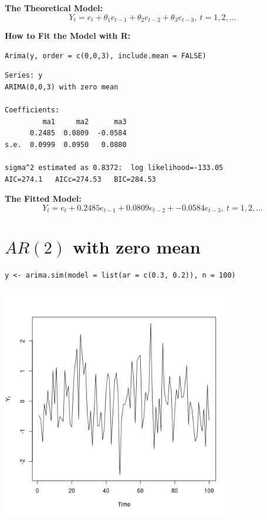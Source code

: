 \documentclass[12pt]{article}
\begin{document}
\noindent
\textbf{The Theoretical Model:} 
\[
Y_{t} = e_{t} + \theta_{1}e_{t - 1} + \theta_{2}e_{t - 2} + \theta_{3}e_{t - 3},\ t = 1,2,\ldots
\]

\noindent
\textbf{How to Fit the Model with R:}

\begin{verbatim}
Arima(y, order = c(0,0,3), include.mean = FALSE)
\end{verbatim}




\begin{verbatim}
Series: y 
ARIMA(0,0,3) with zero mean     

Coefficients:
         ma1     ma2      ma3
      0.2485  0.0809  -0.0584
s.e.  0.0999  0.0950   0.0880

sigma^2 estimated as 0.8372:  log likelihood=-133.05
AIC=274.1   AICc=274.53   BIC=284.53
\end{verbatim}

\noindent
\textbf{The Fitted Model:} 
\[
Y_{t} = e_{t} +  0.2485 e_{t - 1} +  0.0809 e_{t - 2} +  -0.0584 e_{t - 3},\ t = 1,2,\ldots
\]
\section*{$AR(2)$ with zero mean}
\label{sec-2}


\begin{verbatim}
y <- arima.sim(model = list(ar = c(0.3, 0.2)), n = 100)
\end{verbatim}





\includegraphics[width=4.0in]{img/ar2zm.png}
\end{document}
